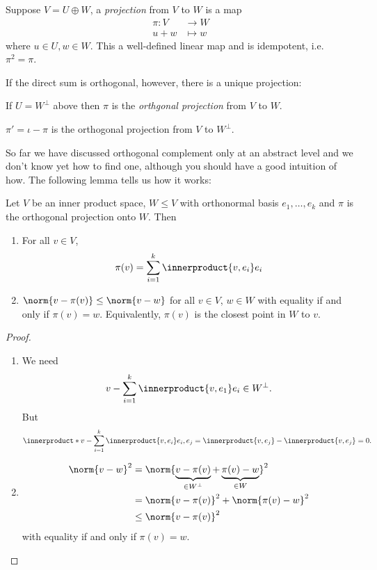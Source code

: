 \documentclass[a4paper]{article}
\newcommand*{\ip}{\innerproduct}
\theoremstyle{definition}
\begin{document}
\begin{definition}[Projection]
  Suppose \(V = U \oplus W\), a \emph{projection} from \(V\) to \(W\) is a map
  \begin{align*}
    \pi: V &\to W \\
    u + w &\mapsto w
  \end{align*}
  where \(u \in U, w \in W\). This a well-defined linear map and is idempotent, i.e.\ \(\pi^2 = \pi\).
\end{definition}

If the direct sum is orthogonal, however, there is a unique projection:

\begin{definition}
  If \(U = W^\perp\) above then \(\pi\) is the \emph{orthgonal projection} from \(V\) to \(W\).
\end{definition}

\begin{note}
  \(\pi' = \iota - \pi\) is the orthogonal projection from \(V\) to \(W^\perp\).
\end{note}

So far we have discussed orthogonal complement only at an abstract level and we don't know yet how to find one, although you should have a good intuition of how. The following lemma tells us how it works:

\begin{lemma}
  Let \(V\) be an inner product space, \(W \leq V\) with orthonormal basis \(e_1, \dots, e_k\) and \(\pi\) is the orthogonal projection onto \(W\). Then
  \begin{enumerate}
  \item For all \(v \in V\),
    \[
      \pi(v) = \sum_{i = 1}^k \ip{v, e_i} e_i
    \]
  \item \(\norm{v - \pi(v)} \leq \norm{v - w}\) for all \(v \in V\), \(w \in W\) with equality if and only if \(\pi(v) = w\). Equivalently, \(\pi(v)\) is the closest point in \(W\) to \(v\).
  \end{enumerate}
\end{lemma}

\begin{proof}\leavevmode
  \begin{enumerate}
  \item We need
    \[
      v - \sum_{i = 1}^k \ip{v, e_1}e_i \in W^\perp.
    \]
    But
    \[
      \ip*{v - \sum_{i = 1}^k \ip{v, e_i}e_i, e_j} = \ip{v, e_j} - \ip{v, e_j} = 0.
    \]
  \item
    \begin{align*}
      \norm{v - w}^2 &= \norm{\underbrace{v - \pi(v)}_{\in W^\perp} + \underbrace{\pi(v) - w}_{\in W}}^2 \\
                     &= \norm{v - \pi(v)}^2 + \norm{\pi(v) - w}^2 \\
                     &\leq \norm{v - \pi(v)}^2
    \end{align*}
    with equality if and only if \(\pi(v) = w\).
  \end{enumerate}
\end{proof}
\end{document}
